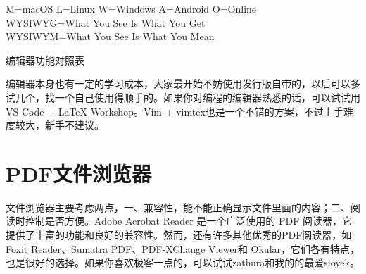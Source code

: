 \begin{table}[thpb]
	\centering

	M=macOS L=Linux W=Windows A=Android O=Online \\
	WYSIWYG=What You See Is What You Get \\
	WYSIWYM=What You See Is What You Mean
	\caption{编辑器功能对照表}
\end{table}

编辑器本身也有一定的学习成本，大家最开始不妨使用发行版自带的，以后可以多试几个，找一个自己使用得顺手的。如果你对编程的编辑器熟悉的话，可以试试用VS
Code + LaTeX Workshop。Vim + vimtex也是一个不错的方案，不过上手难度较大，新手不建议。

\section{PDF文件浏览器}
文件浏览器主要考虑两点，一、兼容性，能不能正确显示文件里面的内容；二、阅读时控制是否方便。Adobe Acrobat Reader
是一个广泛使用的 PDF 阅读器，它提供了丰富的功能和良好的兼容性。然而，还有许多其他优秀的PDF阅读器，如 Foxit
Reader、Sumatra PDF、PDF-XChange Viewer和
Okular，它们各有特点，也是很好的选择。如果你喜欢极客一点的，可以试试zathura和我的的最爱sioyek。
